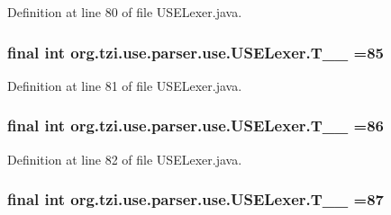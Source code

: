 Definition at line 80 of file U\-S\-E\-Lexer.\-java.

\hypertarget{classorg_1_1tzi_1_1use_1_1parser_1_1use_1_1_u_s_e_lexer_a90e648a4468f1d90d7d60dc9392ab441}{
\subsubsection[{T\-\_\-\-\_\-85}]{\setlength{\rightskip}{0pt plus 5cm}final int org.\-tzi.\-use.\-parser.\-use.\-U\-S\-E\-Lexer.\-T\-\_\-\-\_ =85\hspace{0.3cm}{\ttfamily [static]}}}\label{classorg_1_1tzi_1_1use_1_1parser_1_1use_1_1_u_s_e_lexer_a90e648a4468f1d90d7d60dc9392ab441}


Definition at line 81 of file U\-S\-E\-Lexer.\-java.

\hypertarget{classorg_1_1tzi_1_1use_1_1parser_1_1use_1_1_u_s_e_lexer_afc3aa11cab4ed80f963480970b2fc2a0}{
\subsubsection[{T\-\_\-\-\_\-86}]{\setlength{\rightskip}{0pt plus 5cm}final int org.\-tzi.\-use.\-parser.\-use.\-U\-S\-E\-Lexer.\-T\-\_\-\-\_ =86\hspace{0.3cm}{\ttfamily [static]}}}\label{classorg_1_1tzi_1_1use_1_1parser_1_1use_1_1_u_s_e_lexer_afc3aa11cab4ed80f963480970b2fc2a0}


Definition at line 82 of file U\-S\-E\-Lexer.\-java.

\hypertarget{classorg_1_1tzi_1_1use_1_1parser_1_1use_1_1_u_s_e_lexer_aa81a8f710dd425cbc2276ce167fb84d9}{
\subsubsection[{T\-\_\-\-\_\-87}]{\setlength{\rightskip}{0pt plus 5cm}final int org.\-tzi.\-use.\-parser.\-use.\-U\-S\-E\-Lexer.\-T\-\_\-\-\_ =87\hspace{0.3cm}{\ttfamily [static]}}}\label{classorg_1_1tzi_1_1use_1_1parser_1_1use_1_1_u_s_e_lexer_aa81a8f710dd425cbc2276ce167fb84d9}


